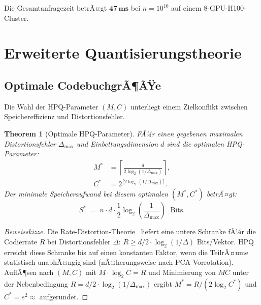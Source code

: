 ﻿\documentclass[12pt,a4paper]{article}
\newtheorem{theorem}{Theorem}[section]
\begin{document}
Die Gesamtanfragezeit betrÃ¤gt $\mathbf{47\,ms}$ bei $n=10^{10}$
auf einem 8-GPU-H100-Cluster.

\section{Erweiterte Quantisierungstheorie}
\label{sec:quant_theorie}

\subsection{Optimale CodebuchgrÃ¶ÃŸe}

Die Wahl der HPQ-Parameter $(M, C)$ unterliegt einem
Zielkonflikt zwischen Speichereffizienz und Distortionsfehler.

\begin{theorem}[Optimale HPQ-Parameter]
\label{thm:optimal_hpq}
FÃ¼r einen gegebenen maximalen Distortionsfehler $\Delta_{\max}$
und Einbettungsdimension $d$ sind die optimalen HPQ-Parameter:
\begin{align}
  M^* &= \left\lceil \frac{d}{2\log_2(1/\Delta_{\max})} \right\rceil, \\
  C^* &= 2^{\lceil 2\log_2(1/\Delta_{\max}) \rceil}.
\end{align}
Der minimale Speicheraufwand bei diesem optimalen $(M^*, C^*)$ betrÃ¤gt:
\[
  S^* \;=\; n \cdot d \cdot \frac{1}{2} \log_2\!\left(\frac{1}{\Delta_{\max}}\right)
  \;\text{ Bits}.
\]
\end{theorem}

\begin{proof}[Beweisskizze]
Die Rate-Distortion-Theorie~\cite{berger1971ratedistortion} liefert
eine untere Schranke fÃ¼r die Codierrate $R$ bei Distortionsfehler
$\Delta$: $R \geq d/2 \cdot \log_2(1/\Delta)$ Bits/Vektor.
HPQ erreicht diese Schranke bis auf einen konstanten Faktor,
wenn die TeilrÃ¤ume statistisch unabhÃ¤ngig sind (nÃ¤herungsweise
nach PCA-Vorrotation). AuflÃ¶sen nach $(M, C)$ mit
$M \cdot \log_2 C = R$ und Minimierung von $MC$ unter
der Nebenbedingung $R = d/2 \cdot \log_2(1/\Delta_{\max})$
ergibt $M^* = R / (2 \log_2 C^*)$ und $C^* = e^2 \approx$ aufgerundet.
\end{proof}
\end{document}
